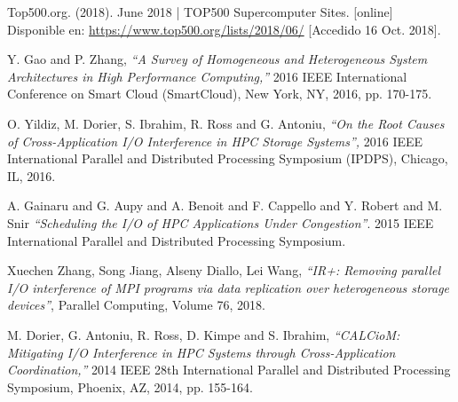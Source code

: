 \begin{thebibliography}{69}



  Top500.org. (2018). June 2018 | TOP500 Supercomputer Sites. [online] Disponible en:  \url{https://www.top500.org/lists/2018/06/} [Accedido 16 Oct. 2018]. 

Y. Gao and P. Zhang, \textit{``A Survey of Homogeneous and Heterogeneous System Architectures in High Performance Computing,''} 2016 IEEE International Conference on Smart Cloud (SmartCloud), New York, NY, 2016, pp. 170-175.

O. Yildiz, M. Dorier, S. Ibrahim, R. Ross and G. Antoniu, \textit{``On the Root Causes of Cross-Application I/O Interference in HPC Storage Systems'',} 2016 IEEE International Parallel and Distributed Processing Symposium (IPDPS), Chicago, IL, 2016.
 
 A. Gainaru and G. Aupy and A. Benoit and F. Cappello and Y. Robert and M. Snir \textit{``Scheduling the I/O of HPC Applications Under Congestion''}. 
2015 IEEE International Parallel and Distributed Processing Symposium.

Xuechen Zhang, Song Jiang, Alseny Diallo, Lei Wang,
\textit{``IR+: Removing parallel I/O interference of MPI programs via data replication over heterogeneous storage devices''},
Parallel Computing,
Volume 76,
2018.

 M. Dorier, G. Antoniu, R. Ross, D. Kimpe and S. Ibrahim, \textit{``CALCioM: Mitigating I/O Interference in HPC Systems through Cross-Application Coordination,''} 2014 IEEE 28th International Parallel and Distributed Processing Symposium, Phoenix, AZ, 2014, pp. 155-164.






\end{thebibliography}
